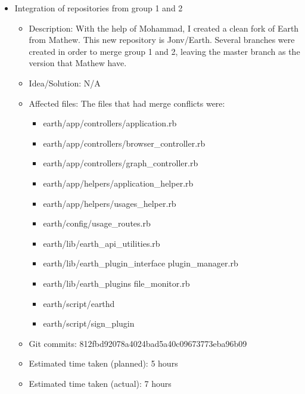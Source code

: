 \documentclass{article}
\begin{document}
\begin{itemize}
	\item Integration of repositories from group 1 and 2
	     \begin{itemize}
                \item Description: With the help of Mohammad, I created a clean fork of Earth from Mathew.  This new repository is Jonv/Earth.  Several branches were created in order to merge group 1 and 2, leaving the master branch as the version that Mathew have.
                \item Idea/Solution: N/A
                \item Affected files: The files that had merge conflicts were:
                                      \begin{itemize}
                                       \item earth/app/controllers/application.rb
                                       \item earth/app/controllers/browser\_controller.rb
                                       \item earth/app/controllers/graph\_controller.rb
                                       \item earth/app/helpers/application\_helper.rb
                                       \item earth/app/helpers/usages\_helper.rb
                                       \item earth/config/usage\_routes.rb
                                       \item earth/lib/earth\_api\_utilities.rb
                                       \item earth/lib/earth\_plugin\_interface plugin\_manager.rb
                                       \item earth/lib/earth\_plugins file\_monitor.rb
                                       \item earth/script/earthd
                                       \item earth/script/sign\_plugin
                                      \end{itemize}
                \item Git commits: 812fbd92078a4024bad5a40c09673773eba96b09
                \item Estimated time taken (planned): 5 hours
                \item Estimated time taken (actual): 7 hours 
            

\end{itemize}
\end{itemize}
\end{document}
